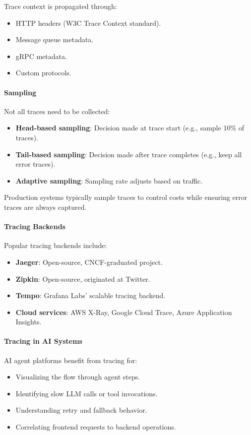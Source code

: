 Trace context is propagated through:
\begin{itemize}
    \item HTTP headers (W3C Trace Context standard).
    \item Message queue metadata.
    \item gRPC metadata.
    \item Custom protocols.
\end{itemize}

\paragraph{Sampling}

Not all traces need to be collected:
\begin{itemize}
    \item \textbf{Head-based sampling}: Decision made at trace start (e.g., sample 10\% of traces).
    \item \textbf{Tail-based sampling}: Decision made after trace completes (e.g., keep all error traces).
    \item \textbf{Adaptive sampling}: Sampling rate adjusts based on traffic.
\end{itemize}

Production systems typically sample traces to control costs while ensuring error traces are always captured.

\paragraph{Tracing Backends}

Popular tracing backends include:
\begin{itemize}
    \item \textbf{Jaeger}: Open-source, CNCF-graduated project.
    \item \textbf{Zipkin}: Open-source, originated at Twitter.
    \item \textbf{Tempo}: Grafana Labs' scalable tracing backend.
    \item \textbf{Cloud services}: AWS X-Ray, Google Cloud Trace, Azure Application Insights.
\end{itemize}

\paragraph{Tracing in AI Systems}

AI agent platforms benefit from tracing for:
\begin{itemize}
    \item Visualizing the flow through agent steps.
    \item Identifying slow LLM calls or tool invocations.
    \item Understanding retry and fallback behavior.
    \item Correlating frontend requests to backend operations.
\end{itemize}

